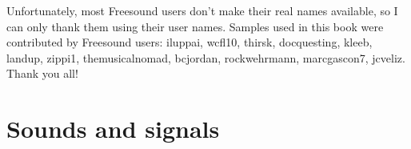 \documentclass[12pt]{book}
\begin{document}
Unfortunately, most Freesound users don't make their real names
available, so I can only thank them using their user names.  Samples
used in this book were contributed by Freesound users: iluppai,
wcfl10, thirsk, docquesting, kleeb, landup, zippi1, themusicalnomad,
bcjordan, rockwehrmann, marcgascon7, jcveliz.  Thank you all!













\normalsize

\clearemptydoublepage

\begin{latexonly}

\tableofcontents

\clearemptydoublepage

\end{latexonly}

\mainmatter


\chapter{Sounds and signals}
\label{sounds}
\end{document}
